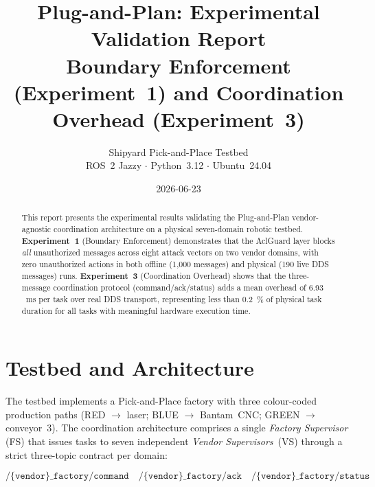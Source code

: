 \documentclass[11pt,a4paper]{article}
\title{\textbf{Plug-and-Plan: Experimental Validation Report}\\
  \large Boundary Enforcement (Experiment~1) and
  Coordination Overhead (Experiment~3)}
\author{Shipyard Pick-and-Place Testbed\\
  ROS~2 Jazzy $\cdot$ Python~3.12 $\cdot$ Ubuntu~24.04}
\date{2026-06-23}
\newcommand{\ms}{\,\si{ms}}
\begin{document}
\maketitle

\begin{abstract}
This report presents the experimental results validating the Plug-and-Plan
vendor-agnostic coordination architecture on a physical seven-domain robotic
testbed.
\textbf{Experiment~1} (Boundary Enforcement) demonstrates that the AclGuard
layer blocks \emph{all} unauthorized messages across eight attack vectors on
two vendor domains, with zero unauthorized actions in both offline (1{,}000
messages) and physical (190 live DDS messages) runs.
\textbf{Experiment~3} (Coordination Overhead) shows that the three-message
coordination protocol (command/ack/status) adds a mean overhead of
\SI{6.93}{\ms} per task over real DDS transport, representing less than
\SI{0.2}{\percent} of physical task duration for all tasks with meaningful
hardware execution time.
\end{abstract}

\tableofcontents

\newpage

\section{Testbed and Architecture}

The testbed implements a Pick-and-Place factory with three colour-coded
production paths (RED $\to$ laser; BLUE $\to$ Bantam~CNC; GREEN $\to$
conveyor~3).
The coordination architecture comprises a single \emph{Factory Supervisor}
(FS) that issues tasks to seven independent \emph{Vendor Supervisors}~(VS)
through a strict three-topic contract per domain:

\[
  \texttt{/\{vendor\}\_factory/command} \quad
  \texttt{/\{vendor\}\_factory/ack} \quad
  \texttt{/\{vendor\}\_factory/status}
\]
\end{document}
